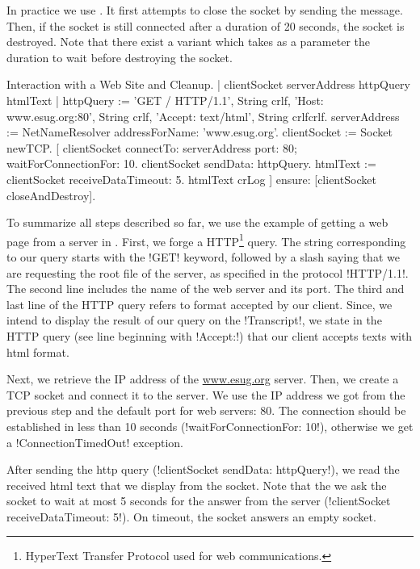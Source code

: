 \documentclass[a4paper,10pt,twoside]{book}
\begin{document}
In practice we use . It first attempts to close the socket by sending the  message. Then, if the socket is still connected after a duration of 20 seconds, the socket is destroyed.
Note that there exist a variant  which takes as a parameter the duration to wait before destroying the socket.

\begin{script}{Interaction with a Web Site and Cleanup.}
| clientSocket serverAddress httpQuery htmlText |
httpQuery := 'GET / HTTP/1.1', String crlf, 
	'Host: www.esug.org:80', String crlf, 
	'Accept: text/html', String crlfcrlf.
serverAddress := NetNameResolver addressForName: 'www.esug.org'.
clientSocket := Socket newTCP.
[ clientSocket 
	connectTo: serverAddress port: 80;
	waitForConnectionFor: 10.
 clientSocket sendData: httpQuery.
 htmlText := clientSocket receiveDataTimeout: 5.
 htmlText crLog ] ensure: [clientSocket closeAndDestroy].
\end{script}

To summarize all steps described so far, we use the example of getting a web page from a server in 
.
First, we forge a HTTP\footnote{HyperText Transfer Protocol used for web communications.} query.
The string corresponding to our query starts with the \ct!GET! keyword, followed by a slash saying that we are requesting the root file of the server, as specified in the protocol \ct!HTTP/1.1!.
The second line includes the name of the web server and its port.
The third and last line of the HTTP query refers to format accepted by our client. 
Since, we intend to display the result of our query on the \ct!Transcript!, we state in the HTTP query (see line beginning with \ct!Accept:!) that our client accepts texts with html format.

Next, we retrieve the IP address of the \url{www.esug.org} server.
Then, we create a TCP socket and connect it to the server.
We use the IP address we got from the previous step and the default port for web servers: 80.
The connection should be established in less than 10 seconds (\ct!waitForConnectionFor: 10!), otherwise we get a \ct!ConnectionTimedOut! exception.

After sending the http query (\ct!clientSocket sendData: httpQuery!), we read the received html text that we display from the socket. Note that the we ask the socket to wait at most 5 seconds for the answer from the server (\ct!clientSocket receiveDataTimeout: 5!).
On timeout, the socket answers an empty socket.
\end{document}
